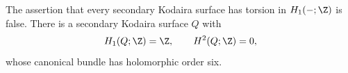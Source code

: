 
\begin{proposition}\hypertarget{tag-01F8}{}\label{cdp:st:C.3.2}



The assertion that every secondary Kodaira surface has torsion in
$H_1(-;\Z)$ is false. There is a secondary Kodaira surface $Q$ with
\[
H_1(Q;\Z)=\Z,\qquad H^2(Q;\Z)=0,
\]
whose canonical bundle has holomorphic order six.
\end{proposition}

